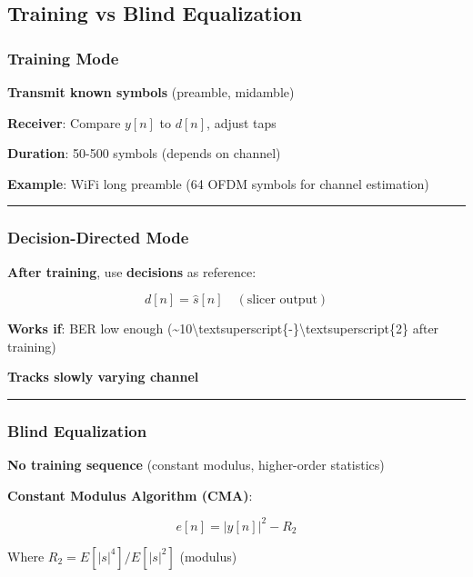 \subsection{Training vs Blind
Equalization}\label{training-vs-blind-equalization}

\subsubsection{Training Mode}\label{training-mode}

\textbf{Transmit known symbols} (preamble, midamble)

\textbf{Receiver}: Compare \(y[n]\) to \(d[n]\), adjust taps

\textbf{Duration}: 50-500 symbols (depends on channel)

\textbf{Example}: WiFi long preamble (64 OFDM symbols for channel
estimation)

\begin{center}\rule{0.5\linewidth}{0.5pt}\end{center}

\subsubsection{Decision-Directed Mode}\label{decision-directed-mode}

\textbf{After training}, use \textbf{decisions} as reference:

\[
d[n] = \hat{s}[n] \quad (\text{slicer output})
\]

\textbf{Works if}: BER low enough
(\textasciitilde10\textbackslash textsuperscript\{-\}\textbackslash textsuperscript\{2\}
after training)

\textbf{Tracks slowly varying channel}

\begin{center}\rule{0.5\linewidth}{0.5pt}\end{center}

\subsubsection{Blind Equalization}\label{blind-equalization}

\textbf{No training sequence} (constant modulus, higher-order
statistics)

\textbf{Constant Modulus Algorithm (CMA)}:

\[
e[n] = |y[n]|^2 - R_2
\]

Where \(R_2 = E[|s|^4] / E[|s|^2]\) (modulus)

